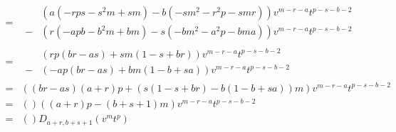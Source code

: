 $$\begin{aligned}
                                \\
                                = &
                                \begin{aligned}
                                    & \left( a ( -rps - s^2m + sm ) - b ( -sm^2 - r^2p - smr ) \right) v^{m - r - a} t^{p - s - b - 2}
                                    \\
                                    - & \left( r ( -apb - b^2m + bm ) - s ( -bm^2 - a^2p - bma ) \right) v^{m - r - a} t^{p - s - b - 2}
                                \end{aligned}
                                \\
                                = &
                                \begin{aligned}
                                    & \left( rp( br - as ) + sm( 1 - s + br) \right) v^{m - r - a} t^{p - s - b - 2}
                                    \\
                                    - & \left( -ap( br - as ) + bm( 1 - b + sa ) \right) v^{m - r - a} t^{p - s - b - 2}
                                \end{aligned}
                                \\
                                = & \left( (br - as) (a + r) p + \left( s( 1 - s + br) - b(1 - b + sa)\right) m \right) v^{m - r - a} t^{p - s - b - 2}
                                \\
                                = & \left(  \right) \left( (a + r) p - (b + s + 1) m \right) v^{m - r - a} t^{p - s - b - 2}
                                \\
                                = & \left(\right) D_{a + r, b + s + 1}(v^m t^p)
                            \end{aligned}
                        $$